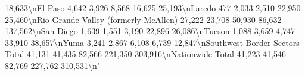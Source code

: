 \documentclass[
  12pt,
  openany]{book}
\newenvironment{Shaded}{\begin{snugshade}}{\end{snugshade}}
\begin{document}
\begin{Shaded}
\begin{Highlighting}[]
          18,633\textbackslash{}nEl Paso                                         4,642                     3,926                8,568           16,625             25,193\textbackslash{}nLaredo                                           477                      2,033                2,510           22,950             25,460\textbackslash{}nRio Grande Valley (formerly McAllen)           27,222                    23,708                50,930          86,632            137,562\textbackslash{}nSan Diego                                       1,639                     1,551                3,190           22,896             26,086\textbackslash{}nTucson                                          1,088                     3,659                4,747           33,910             38,657\textbackslash{}nYuma                                            3,241                     2,867                6,108            6,739             12,847\textbackslash{}nSouthwest Border Sectors Total                 41,131                    41,435                82,566         221,350            303,916\textbackslash{}nNationwide Total                               41,223                    41,546                82,769         227,762            310,531\textbackslash{}n"                                                                                                                                                                                                                                                                                                                                                                                                                                                                                                                                                                                                                                                                                                                                                                                                                                                                                                                                                                                                                                                                                                                                                                                                                                                                                                                                                                                                                                                                                                                                                                                                                                                                                                                                                                                                                                                                                                                                                                                                                                                                                                                        
\end{Highlighting}
\end{Shaded}
\end{document}
